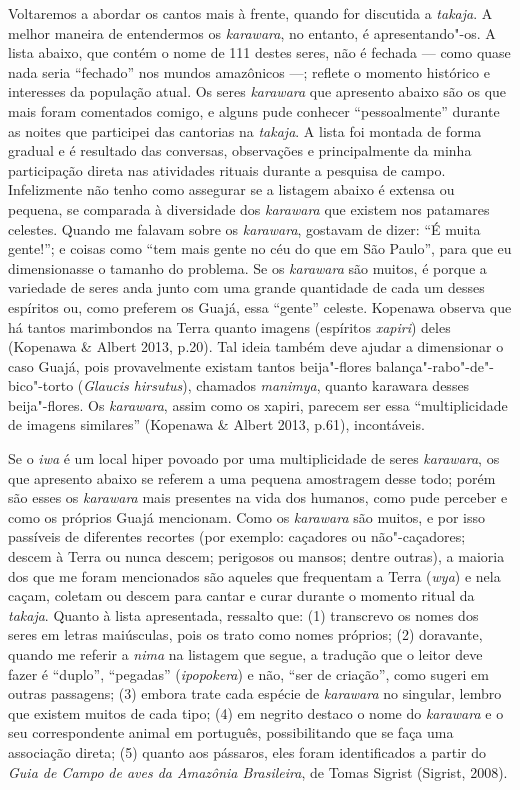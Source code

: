 Voltaremos a abordar os cantos mais à frente, quando for discutida a
\emph{takaja}. A melhor maneira de entendermos os \emph{karawara}, no
entanto, é apresentando"-os. A lista abaixo, que contém o nome de 111
destes seres, não é fechada --- como quase nada seria ``fechado'' nos mundos
amazônicos ---; reflete o momento histórico e interesses da população
atual. Os seres \emph{karawara} que apresento abaixo são os que mais
foram comentados comigo, e alguns pude conhecer ``pessoalmente'' durante
as noites que participei das cantorias na \emph{takaja}. A lista foi
montada de forma gradual e é resultado das conversas, observações e
principalmente da minha participação direta nas atividades rituais
durante a pesquisa de campo. Infelizmente não tenho como assegurar se a
listagem abaixo é extensa ou pequena, se comparada à diversidade dos
\emph{karawara} que existem nos patamares celestes. Quando me falavam
sobre os \emph{karawara}, gostavam de dizer: ``É muita gente!''; e
coisas como ``tem mais gente no céu do que em São Paulo'', para que eu
dimensionasse o tamanho do problema. Se os \emph{karawara} são muitos, é
porque a variedade de seres anda junto com uma grande quantidade de cada
um desses espíritos ou, como preferem os Guajá, essa ``gente'' celeste.
Kopenawa observa que há tantos marimbondos na Terra quanto imagens
(espíritos \emph{xapiri}) deles (Kopenawa \& Albert 2013, p.20). Tal
ideia também deve ajudar a dimensionar o caso Guajá, pois provavelmente
existam tantos beija"-flores balança"-rabo"-de"-bico"-torto (\emph{Glaucis
hirsutus}), chamados \emph{manimya}, quanto karawara desses
beija"-flores. Os \emph{karawara}, assim como os xapiri, parecem ser essa
``multiplicidade de imagens similares'' (Kopenawa \& Albert 2013, p.61),
incontáveis.

Se o \emph{iwa} é um local hiper povoado por uma multiplicidade de seres
\emph{karawara}, os que apresento abaixo se referem a uma pequena
amostragem desse todo; porém são esses os \emph{karawara} mais presentes
na vida dos humanos, como pude perceber e como os próprios Guajá
mencionam. Como os \emph{karawara} são muitos, e por isso passíveis de
diferentes recortes (por exemplo: caçadores ou não"-caçadores; descem à
Terra ou nunca descem; perigosos ou mansos; dentre outras), a maioria
dos que me foram mencionados são aqueles que frequentam a Terra
(\emph{wya}) e nela caçam, coletam ou descem para cantar e curar durante
o momento ritual da \emph{takaja}. Quanto à lista apresentada, ressalto
que: (1) transcrevo os nomes dos seres em letras maiúsculas, pois os
trato como nomes próprios; (2) doravante, quando me referir a
\emph{nima} na listagem que segue, a tradução que o leitor deve fazer é
``duplo'', ``pegadas'' (\emph{ipopokera}) e não, ``ser de
criação'', como sugeri em outras passagens; (3) embora trate cada espécie
de \emph{karawara} no singular, lembro que existem muitos de cada tipo;
(4) em negrito destaco o nome do \emph{karawara} e o seu correspondente
animal em português, possibilitando que se faça uma associação direta;
(5) quanto aos pássaros, eles foram identificados a partir do \emph{Guia
de Campo} \emph{de aves da Amazônia Brasileira}, de Tomas Sigrist
(Sigrist, 2008).

